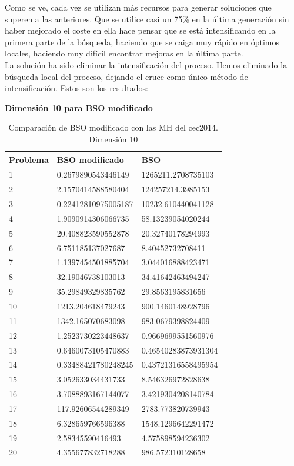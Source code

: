Como se ve, cada vez se utilizan más recursos para generar soluciones que superen a las anteriores. Que se utilice casi un 75\% en la última generación sin haber mejorado el coste en ella hace pensar que se está intensificando en la primera parte de la búsqueda, haciendo que se caiga muy rápido en óptimos locales, haciendo muy difícil encontrar mejoras en la última parte.\\

La solución ha sido eliminar la intensificación del proceso. Hemos eliminado la búsqueda local del proceso, dejando el cruce como único método de intensificación. Estos son los resultados:\\

\newpage

\textbf{Dimensión 10 para BSO modificado}
\begin{table}[htbp]
	\begin{center}
		\begin{tabular}{|l|l|l|}
			\hline
			Problema & BSO modificado & BSO \\
			\hline \hline
			1 & 0.2679890543446149 & 1265211.2708735103 \\ \hline
			2 & 2.1570414588580404 & 124257214.3985153 \\ \hline
			3 & 0.22412810975005187 & 10232.610440041128 \\ \hline
			4 & 1.9090914306066735 & 58.13239054020244 \\ \hline
			5 & 20.408823590552878 & 20.32740178294993 \\ \hline
			6 & 6.751185137027687 & 8.40452732708411 \\ \hline
			7 & 1.1397454501885704 & 3.044016888423471 \\ \hline
			8 & 32.19046738103013 & 34.41642463494247 \\ \hline
			9 & 35.29849329835762 & 29.8563195831656 \\ \hline
			10 & 1213.204618479243 & 900.1460148928796 \\ \hline
			11 & 1342.165070683098 & 983.0679398824409 \\ \hline
			12 & 1.2523730223448637 & 0.9669699551560976 \\ \hline
			13 & 0.6460073105470883 & 0.46540283873931304 \\ \hline
			14 & 0.33488421780248245 & 0.43721316558495954  \\ \hline
			15 & 3.052633034431733 & 8.546326972828638 \\ \hline
			16 & 3.7088893167144077 & 3.4219304208140784 \\ \hline
			17 & 117.92606544289349 & 2783.773820739943 \\ \hline
			18 & 6.328659766596388 & 1548.1296642291472 \\ \hline
			19 & 2.58345590416493 & 4.575898594236302 \\ \hline
			20 & 4.355677832718288 & 986.572310128658 \\ \hline
		\end{tabular}
		\caption{Comparación de BSO modificado con las MH del cec2014. Dimensión 10}
		\label{tabla:Dimension10MejoraComparativa}
	\end{center}
\end{table}

